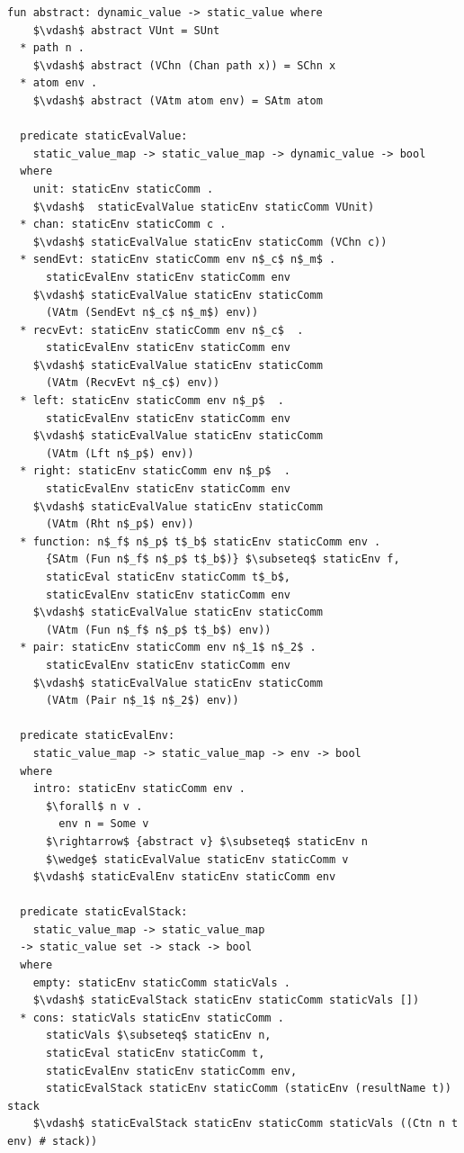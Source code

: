 \documentclass[letterpaper, 11pt]{extarticle}
\begin{document}
\begin{lstlisting}[language=logic, mathescape]
  fun abstract: dynamic_value -> static_value where
    $\vdash$ abstract VUnt = SUnt
  * path n . 
    $\vdash$ abstract (VChn (Chan path x)) = SChn x
  * atom env .
    $\vdash$ abstract (VAtm atom env) = SAtm atom

  predicate staticEvalValue:
    static_value_map -> static_value_map -> dynamic_value -> bool
  where
    unit: staticEnv staticComm .
    $\vdash$  staticEvalValue staticEnv staticComm VUnit)
  * chan: staticEnv staticComm c .
    $\vdash$ staticEvalValue staticEnv staticComm (VChn c))
  * sendEvt: staticEnv staticComm env n$_c$ n$_m$ .
      staticEvalEnv staticEnv staticComm env
    $\vdash$ staticEvalValue staticEnv staticComm
      (VAtm (SendEvt n$_c$ n$_m$) env))
  * recvEvt: staticEnv staticComm env n$_c$  .
      staticEvalEnv staticEnv staticComm env
    $\vdash$ staticEvalValue staticEnv staticComm
      (VAtm (RecvEvt n$_c$) env))
  * left: staticEnv staticComm env n$_p$  .
      staticEvalEnv staticEnv staticComm env
    $\vdash$ staticEvalValue staticEnv staticComm
      (VAtm (Lft n$_p$) env))
  * right: staticEnv staticComm env n$_p$  .
      staticEvalEnv staticEnv staticComm env
    $\vdash$ staticEvalValue staticEnv staticComm
      (VAtm (Rht n$_p$) env))
  * function: n$_f$ n$_p$ t$_b$ staticEnv staticComm env .
      {SAtm (Fun n$_f$ n$_p$ t$_b$)} $\subseteq$ staticEnv f, 
      staticEval staticEnv staticComm t$_b$, 
      staticEvalEnv staticEnv staticComm env
    $\vdash$ staticEvalValue staticEnv staticComm
      (VAtm (Fun n$_f$ n$_p$ t$_b$) env))
  * pair: staticEnv staticComm env n$_1$ n$_2$ .
      staticEvalEnv staticEnv staticComm env
    $\vdash$ staticEvalValue staticEnv staticComm
      (VAtm (Pair n$_1$ n$_2$) env))

  predicate staticEvalEnv:
    static_value_map -> static_value_map -> env -> bool
  where 
    intro: staticEnv staticComm env .
      $\forall$ n v .
        env n = Some v 
      $\rightarrow$ {abstract v} $\subseteq$ staticEnv n
      $\wedge$ staticEvalValue staticEnv staticComm v
    $\vdash$ staticEvalEnv staticEnv staticComm env

  predicate staticEvalStack:
    static_value_map -> static_value_map 
  -> static_value set -> stack -> bool 
  where
    empty: staticEnv staticComm staticVals .
    $\vdash$ staticEvalStack staticEnv staticComm staticVals [])
  * cons: staticVals staticEnv staticComm . 
      staticVals $\subseteq$ staticEnv n,
      staticEval staticEnv staticComm t,
      staticEvalEnv staticEnv staticComm env,
      staticEvalStack staticEnv staticComm (staticEnv (resultName t)) stack 
    $\vdash$ staticEvalStack staticEnv staticComm staticVals ((Ctn n t env) # stack))


\end{lstlisting}
\end{document}
